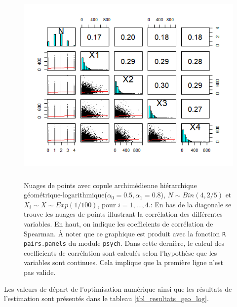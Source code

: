 \documentclass{article}
\begin{document}
	\begin{figure}[H]
		\centering
		\includegraphics[height=10cm]{Graph/scatterplot_geo_log.png}
		\caption[Nuages de points du scénario \ref{scenario_geo_log}]
		{Nuages de points avec copule archimédienne hiérarchique géométrique-logarithmique($\alpha_0=0.5, \alpha_1 = 0.8$), $N \sim Bin(4, 2/5)$ et $X_i \sim X \sim Exp(1/100)$, pour $i=1,\dots, 4$.:
			En bas de la diagonale se trouve les nuages de points illustrant la corrélation des différentes variables. En haut, on indique les coefficients de corrélation de Spearman. À noter que ce graphique est produit avec la fonction \texttt{R} \texttt{pairs.panels} du module \texttt{psych}. Dans cette dernière, le calcul des coefficients de corrélation sont calculés selon l'hypothèse que les variables sont continues. Cela implique que la première ligne n'est pas valide.}
		\label{graph_scatterplot_geo_log}
	\end{figure}

	Les valeurs de départ de l'optimisation numérique ainsi que les résultats de l'estimation sont présentés dans le tableau \ref{tbl_resultats_geo_log}.
	
\end{document}
